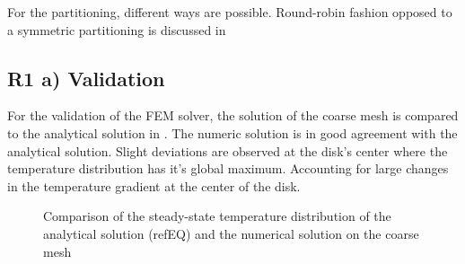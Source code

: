 For the partitioning, different ways are possible. Round-robin fashion opposed to a symmetric partitioning is discussed in 

\subsection{R1 a) Validation}
For the validation of the FEM solver, the solution of the coarse mesh is compared to the analytical solution in . The numeric solution is in good agreement with the analytical solution. Slight deviations are observed at the disk's center where the temperature distribution has it's global maximum. Accounting for large changes in the temperature gradient at the center of the disk. 

\begin{figure}[!htbp]
	\centering
	\leavevmode
	\resizebox{0.8\width}{!}{}
	\caption{Comparison of the steady-state temperature distribution of the analytical solution (refEQ) and the numerical solution on the coarse mesh}
	\label{fig::TemperatureDist}
\end{figure}
